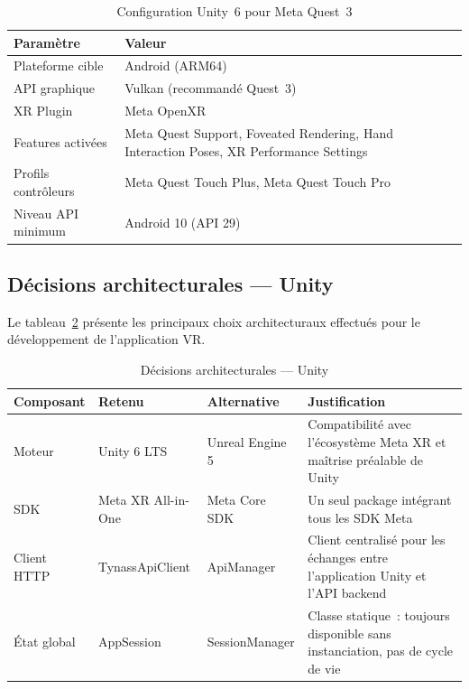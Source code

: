 \begin{table}[H]
  \centering
  \begin{tabularx}{\textwidth}{lX}
    \toprule
    \textbf{Paramètre} & \textbf{Valeur} \\
    \midrule
    Plateforme cible     & Android (ARM64) \\
    API graphique        & Vulkan (recommandé Quest~3) \\
    XR Plugin            & Meta OpenXR \\
    Features activées    & Meta Quest Support, Foveated Rendering,
                           Hand Interaction Poses, XR Performance Settings \\
    Profils contrôleurs  & Meta Quest Touch Plus, Meta Quest Touch Pro \\
    Niveau API minimum   & Android 10 (API 29) \\
    \bottomrule
  \end{tabularx}
  \caption{Configuration Unity~6 pour Meta Quest~3}
  \label{tab:unity_config}
\end{table}

\subsection{Décisions architecturales --- Unity}

Le tableau~\ref{tab:archi_unity} présente les principaux choix architecturaux
effectués pour le développement de l'application VR.

\begin{table}[H]
  \centering
  \begin{tabularx}{\textwidth}{lllX}
    \toprule
    \textbf{Composant} & \textbf{Retenu} & \textbf{Alternative} & \textbf{Justification} \\
    \midrule
    Moteur & Unity 6 LTS & Unreal Engine 5 &
Compatibilité avec l'écosystème Meta XR et maîtrise préalable de Unity \\
    SDK    & Meta XR All-in-One & Meta Core SDK & Un seul package intégrant tous les
                                                  SDK Meta \\
    Client HTTP & TynassApiClient & ApiManager &
Client centralisé pour les échanges entre l'application Unity et l'API backend \\

    État global & AppSession & SessionManager & Classe statique~: toujours disponible
                                                sans instanciation, pas de cycle de vie \\
    \bottomrule
  \end{tabularx}
  \caption{Décisions architecturales --- Unity}
  \label{tab:archi_unity}
\end{table}

